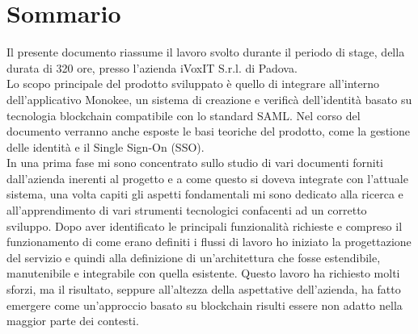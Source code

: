 
\cleardoublepage
{}
{}
\begingroup
\let\clearpage\relax
\let\cleardoublepage\relax
\let\cleardoublepage\relax

\chapter*{Sommario}

Il presente documento riassume il lavoro svolto durante il periodo di stage, della durata
di 320 ore, presso l’azienda iVoxIT S.r.l. di Padova.\\
Lo scopo principale del prodotto sviluppato è quello di integrare all'interno dell'applicativo Monokee, un sistema di creazione e verificà dell'identità basato su tecnologia blockchain compatibile con lo standard SAML. 
Nel corso del documento verranno anche esposte le basi teoriche del prodotto, come la gestione delle identità e il Single Sign-On (SSO).\\
In una prima fase mi sono concentrato sullo studio di vari documenti forniti dall'azienda inerenti al progetto e a come questo si doveva integrate con l'attuale sistema,
una volta capiti gli aspetti fondamentali mi sono dedicato alla ricerca e all'apprendimento di vari strumenti tecnologici
confacenti ad un corretto sviluppo.
Dopo aver identificato le principali funzionalità richieste e compreso il funzionamento di come erano definiti i flussi di lavoro ho iniziato la progettazione del servizio e quindi alla definizione di
un’architettura che fosse estendibile, manutenibile e integrabile con quella esistente. Questo lavoro ha
richiesto molti sforzi, ma il risultato, seppure all’altezza della aspettative dell’azienda, ha fatto emergere come un'approccio basato su blockchain risulti essere non adatto nella maggior parte dei contesti.


%
%

\endgroup			

\vfill

